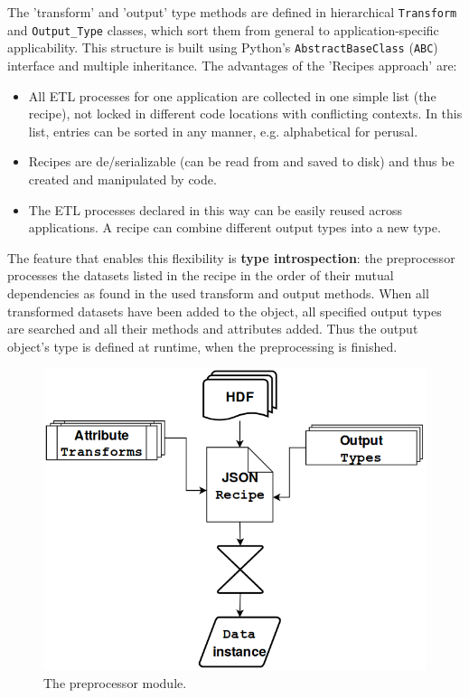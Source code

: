 The 'transform' and 'output' type methods are defined in hierarchical
\texttt{Transform} and \texttt{Output\_Type} classes, which sort them from
general to application-specific applicability. This structure is built using
Python's \texttt{AbstractBaseClass} (\texttt{ABC}) interface and multiple
inheritance. The advantages of the 'Recipes approach' are:
\begin{itemize}
\item All ETL processes for one application are collected in one simple list
    (the recipe), not locked in different code locations with conflicting
    contexts. In this list, entries can be sorted in any manner, e.g.
    alphabetical for perusal.
\item Recipes are de/serializable (can be read from and saved to disk) and thus be
    created and manipulated by code.
\item The ETL processes declared in this way can be easily reused across
    applications. A recipe can combine different output types into a new type.
\end{itemize}

The feature that enables this flexibility is \textbf{type introspection}: the
preprocessor processes the datasets listed in the recipe in the order of their
mutual dependencies as found in the used transform and output methods. When all
transformed datasets have been added to the object, all specified output types
are searched and all their methods and attributes added. Thus the output
object's type is defined at runtime, when the preprocessing is finished.

\begin{figure}[htb!]
    \centering
    \includegraphics[width=0.6\linewidth]{img/reader_flowchart4.png}
    \caption{The preprocessor module.}
    \label{fig:preprocessor}
\end{figure}




